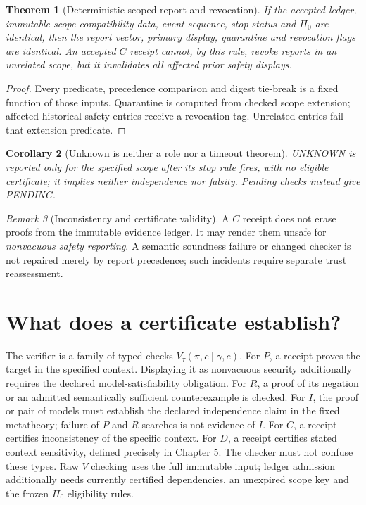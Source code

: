 \documentclass[11pt,letterpaper,oneside]{book}
\newtheorem{theorem}{Theorem}[chapter]
\newtheorem{corollary}[theorem]{Corollary}
\theoremstyle{definition}
\theoremstyle{remark}
\newtheorem{remark}[theorem]{Remark}
\begin{document}
\begin{theorem}[Deterministic scoped report and revocation]
\label{thm:arbiter}
If the accepted ledger, immutable scope-compatibility data, event
sequence, stop status and $\Pi_0$ are identical, then the report vector,
primary display, quarantine and revocation flags are identical.
An accepted $C$ receipt cannot, by this rule, revoke reports in an
unrelated scope, but it invalidates all affected prior safety displays.
\end{theorem}
\begin{proof}
Every predicate, precedence comparison and digest tie-break is a
fixed function of those inputs. Quarantine is computed from checked
scope extension; affected historical safety entries receive a
revocation tag. Unrelated entries fail that extension predicate.
\end{proof}
\begin{corollary}[Unknown is neither a role nor a timeout theorem]
\textsf{UNKNOWN} is reported only for the specified scope after its
stop rule fires, with no eligible certificate; it implies neither
independence nor falsity. Pending checks instead give
\textsf{PENDING}.
\end{corollary}
\begin{remark}[Inconsistency and certificate validity]
A $C$ receipt does not erase proofs from the immutable evidence
ledger. It may render them unsafe for \emph{nonvacuous safety reporting}.
A semantic soundness failure or changed checker is not repaired
merely by report precedence; such incidents require separate trust
reassessment.
\end{remark}

\section{What does a certificate establish?}
The verifier is a family of typed checks $V_{\tau}(\pi,c\mid\gamma,e)$.
For $P$, a receipt proves the target in the specified context.
Displaying it as nonvacuous security additionally requires the
declared model-satisfiability obligation. For $R$,
a proof of its negation or an admitted semantically sufficient
counterexample is checked. For $I$, the proof or pair of models must
establish the declared independence claim in the fixed metatheory;
failure of $P$ and $R$ searches is not evidence of $I$. For $C$, a
receipt certifies inconsistency of the specific context. For $D$, a
receipt certifies stated context sensitivity, defined precisely in
Chapter 5. The checker must not confuse these types. Raw $V$ checking
uses the full immutable input; ledger admission additionally needs
currently certified dependencies, an unexpired scope key and the
frozen $\Pi_0$ eligibility rules.
\end{document}

